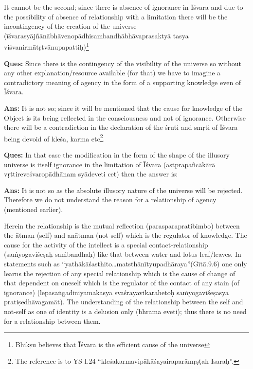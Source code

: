 It cannot be the second; since there is absence of ignorance in Īśvara and due to the possibility of absence of relationship with a limitation there will be the incontingency of the creation of the universe (īśvarasyājñānābhāvenopādhisambandhābhāvaprasaktyā tasya viśvanirmātṛtvānupapattiḥ)\footnote{Bhikṣu believes that Īśvara is the efficient cause of the universe}

\textbf{Ques:} Since there is the contingency of the visibility of the universe so without any other explanation/resource available (for that) we have to imagine a contradictory meaning of agency in the form of a supporting knowledge even of Īśvara.

\textbf{Ans:} It is not so; since it will be mentioned that the cause for knowledge of the Object is its being reflected in the consciousness and not of ignorance. Otherwise there will be a contradiction in the declaration of the śruti and smṛti of Īśvara being devoid of kleśa, karma etc\footnote{The reference is to YS I.24 “kleśakarmavipākāśayairaparāmṛṣṭah Īsaraḥ”.}.

\textbf{Ques:} In that case the modification in the form of the shape of the illusory universe is itself ignorance in the limitation of Īśvara (astprapañcākārā vṛttireveśvaropādhānam syādeveti cet) then the answer is:

\textbf{Ans:} It is not so as the absolute illusory nature of the universe will be rejected. Therefore we do not understand the reason for a relationship of agency (mentioned earlier).

Herein the relationship is the mutual reflection (parasparapratibimbo) between the ātman (self) and anātman (not-self) which is the regulator of knowledge. The cause for the activity of the intellect is a special contact-relationship (saṁyogaviśeṣaḥ saṁbandhaḥ) like that between water and lotus leaf/leaves. In statements such as “yathākāśasthito…matsthānītyupadhāraya”(Gītā.9.6) one only learns the rejection of any special relationship which is the cause of change of that dependent on oneself which is the regulator of the contact of any stain (of ignorance) (lepasaṅgādiniyāmakasya svāśrayāvikārahetoḥ saṁyogaviśeṣasya pratiṣedhāvagamāt). The understanding of the relationship between the self and not-self as one of identity is a delusion only (bhrama eveti); thus there is no need for a relationship between them.


